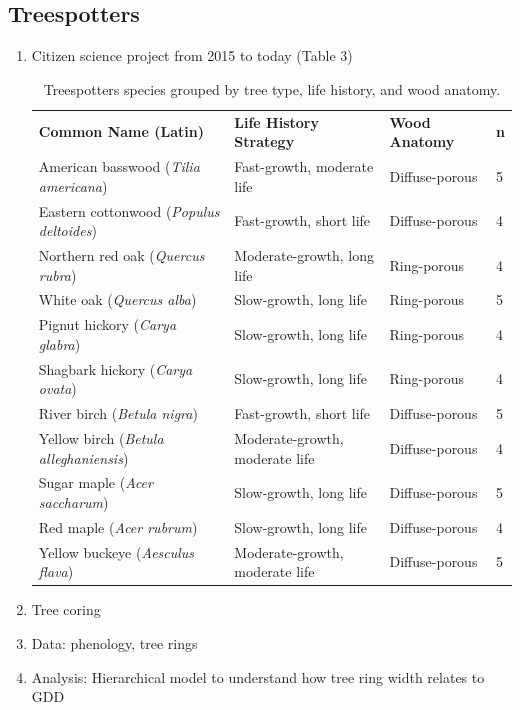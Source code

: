 \documentclass{article}
\begin{document}
\subsection{Treespotters}
\begin {enumerate}
	\item Citizen science project from 2015 to today (Table 3)
\begin{table}[h]
\centering
\caption{Treespotters species grouped by tree type, life history, and wood anatomy.}
\begin{tabular}{|>{\raggedright\arraybackslash}p{7cm}|p{5cm}|p{3cm}|p{1cm}|}
\hline
\multicolumn{4}{|c|}{\textbf{Deciduous Trees}} \\
\hline
\textbf{Common Name (Latin)} & \textbf{Life History Strategy} & \textbf{Wood Anatomy} & \textbf{n} \\
\hline
American basswood (\textit{Tilia americana}) & Fast-growth, moderate life & Diffuse-porous & 5\\
Eastern cottonwood (\textit{Populus deltoides}) & Fast-growth, short life & Diffuse-porous & 4\\
Northern red oak (\textit{Quercus rubra}) & Moderate-growth, long life & Ring-porous & 4\\
White oak (\textit{Quercus alba}) & Slow-growth, long life & Ring-porous & 5\\
Pignut hickory (\textit{Carya glabra}) & Slow-growth, long life & Ring-porous & 4\\
Shagbark hickory (\textit{Carya ovata}) & Slow-growth, long life & Ring-porous & 4\\
River birch (\textit{Betula nigra}) & Fast-growth, short life & Diffuse-porous & 5\\
Yellow birch (\textit{Betula alleghaniensis}) & Moderate-growth, moderate life & Diffuse-porous & 4\\
Sugar maple (\textit{Acer saccharum}) & Slow-growth, long life & Diffuse-porous & 5\\
Red maple (\textit{Acer rubrum}) & Slow-growth, long life & Diffuse-porous & 4\\
Yellow buckeye (\textit{Aesculus flava}) & Moderate-growth, moderate life & Diffuse-porous & 5\\
\hline
\end{tabular}
\end{table}

	\item Tree coring
	\item Data: phenology, tree rings
	\item Analysis: Hierarchical model to understand how tree ring width relates to GDD	
\end {enumerate}
\end{document}
